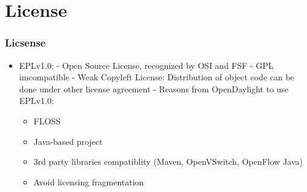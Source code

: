 \section{License}

\begin{frame}[allowframebreaks]
\frametitle{Licsense}

\begin{itemize}
 \item EPLv1.0:\linebreak
 - Open Source License, recognized by OSI and FSF\linebreak
 - GPL imcompatible\linebreak
 - Weak Copyleft License: Distribution of object code can be done under other license agreement\linebreak
 - Reasons from OpenDaylight to use EPLv1.0:
 \begin{itemize}
   \item FLOSS
   \item Java-based project
   \item 3rd party libraries compatiblity (Maven, OpenVSwitch, OpenFlow Java)
   \item Avoid licensing fragmentation
 \end{itemize}
\end{itemize}

\end{frame}
